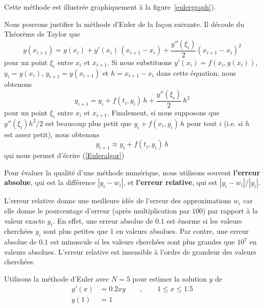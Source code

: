 {

Cette méthode est illustrée graphiquement à la figure~\ref{eulergraph}).
 
\begin{rmk}
Nous pouvons justifier la méthode d'Euler de la façon suivante.  Il
découle du Théorème de Taylor que
\[
y(x_{i+1}) = y(x_i) + y'(x_i)\,(x_{i+1} -x_i) +
\frac{y''(\xi_i)}{2}\left(x_{i+1} - x_i\right)^2
\]
pour un point $\xi_i$ entre $x_i$ et $x_{i+1}$.  Si nous substituons
$y'(x_i) = f(x_i,y(x_i))$, $y_i = y(x_i)$, $y_{i+1} = y(x_{i+1})$ et
$h=x_{i+1}-x_i$ dans cette équation, nous obtenons
\[
y_{i+1} = y_i + f(t_i,y_i)\,h + \frac{y''(\xi_i)}{2}\,h^2
\]
pour un point $\xi_i$ entre $x_i$ et $x_{i+1}$.  Finalement, si nous
supposons que $y''(\xi_i)h^2/2$ est beaucoup plus petit que
$y_i + f(x_i,y_i)\,h$ pour tout $i$ (i.e. si $h$ est assez petit), nous
obtenons
\[
y_{i+1} \approx y_i + f(t_i,y_i)\,h
\]
qui nous permet d'écrire (\ref{Euleralgor})
\end{rmk}

\begin{rmk}
Pour évaluer la qualité d'une méthode numérique, nous utilisons souvent
{\bfseries l'erreur absolue}, qui est la
différence $|y_i - w_i|$, et
{\bfseries l'erreur relative}, qui est
$|y_i-w_i|/|y_i|$.

L'erreur relative donne une meilleure idée de l'erreur des
approximations $w_i$ car elle donne le pourcentage d'erreur (après
multiplication par $100$) par rapport à la valeur exacte $y_i$.  En
effet, une erreur absolue de $0.1$ est énorme si les valeurs cherchées
$y_i$ sont plus petites que $1$ en valeurs absolues.  Par contre, une
erreur absolue de $0.1$ est minuscule si les valeurs cherchées sont
plus grandes que $10^7$ en valeurs absolues.  L'erreur relative est
insensible à l'ordre de grandeur des valeurs cherchées.
\end{rmk}

\begin{egg}
Utilisons la méthode d'Euler avec $N=5$ pour estimer la solution $y$ de
\begin{equation}\label{ODE_EX1}
\begin{split}
y'(x) & =  0.2xy \qquad , \qquad 1 \leq x \leq 1.5 \\
y(1) & =  1
\end{split}
\end{equation}


\end{egg}}
